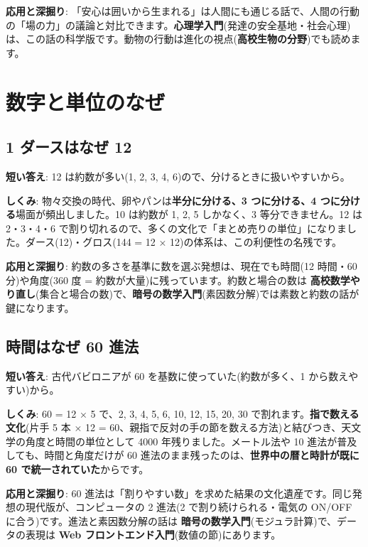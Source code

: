 \documentclass{article}
\begin{document}
\textbf{応用と深掘り}: 「安心は囲いから生まれる」は人間にも通じる話で、人間の行動の「場の力」の議論と対比できます。\textbf{心理学入門}(発達の安全基地・社会心理)は、この話の科学版です。動物の行動は進化の視点(\textbf{高校生物の分野})でも読めます。

\section{数字と単位のなぜ}

\subsection{1 ダースはなぜ 12}

\textbf{短い答え}: 12 は約数が多い(1, 2, 3, 4, 6)ので、分けるときに扱いやすいから。

\textbf{しくみ}: 物々交換の時代、卵やパンは\textbf{半分に分ける、3 つに分ける、4 つに分ける}場面が頻出しました。10 は約数が 1, 2, 5 しかなく、3 等分できません。12 は 2・3・4・6 で割り切れるので、多くの文化で「まとめ売りの単位」になりました。ダース(12)・グロス(144 = 12 × 12)の体系は、この利便性の名残です。

\textbf{応用と深掘り}: 約数の多さを基準に数を選ぶ発想は、現在でも時間(12 時間・60 分)や角度(360 度 = 約数が大量)に残っています。約数と場合の数は \textbf{高校数学やり直し}(集合と場合の数)で、\textbf{暗号の数学入門}(素因数分解)では素数と約数の話が鍵になります。

\subsection{時間はなぜ 60 進法}

\textbf{短い答え}: 古代バビロニアが 60 を基数に使っていた(約数が多く、1 から数えやすい)から。

\textbf{しくみ}: 60 = 12 × 5 で、2, 3, 4, 5, 6, 10, 12, 15, 20, 30 で割れます。\textbf{指で数える文化}(片手 5 本 × 12 = 60、親指で反対の手の節を数える方法)と結びつき、天文学の角度と時間の単位として 4000 年残りました。メートル法や 10 進法が普及しても、時間と角度だけが 60 進法のまま残ったのは、\textbf{世界中の暦と時計が既に 60 で統一されていた}からです。

\textbf{応用と深掘り}: 60 進法は「割りやすい数」を求めた結果の文化遺産です。同じ発想の現代版が、コンピュータの 2 進法(2 で割り続けられる・電気の ON/OFF に合う)です。進法と素因数分解の話は \textbf{暗号の数学入門}(モジュラ計算)で、データの表現は \textbf{Web フロントエンド入門}(数値の節)にあります。
\end{document}
